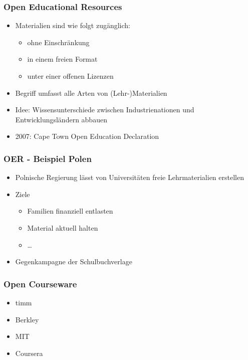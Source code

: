 \documentclass[table]{beamer}
\begin{document}
\begin{frame}
  \frametitle{Open Educational Resources}
    \begin{itemize}
        \item<2-> Materialien sind wie folgt zugänglich:
            \begin{itemize}
                \item<3-> ohne Einschränkung
                \item<4-> in einem freien Format
                \item<5-> unter einer offenen Lizenzen 
            \end{itemize}
        \item<6-> Begriff umfasst alle Arten von (Lehr-)Materialien
        \item<7-> Idee: Wissensunterschiede zwischen Industrienationen und Entwicklungsländern abbauen
        \item<8-> 2007: Cape Town Open Education Declaration
    \end{itemize}
\end{frame}

\begin{frame}
    \frametitle{OER - Beispiel Polen}
    \begin{itemize}
        \item<2-> Polnische Regierung lässt von Universitäten freie Lehrmaterialien erstellen
        \item<3-> Ziele
            \begin{itemize}
                \item<4-> Familien finanziell entlasten
                \item<5-> Material aktuell halten
                \item<6-> \ldots
            \end{itemize}
        \item<7-> Gegenkampagne der Schulbuchverlage
    \end{itemize}
\end{frame}

\begin{frame}
    \frametitle{Open Courseware}
      \begin{itemize}
        \item<2-> timm
        \item<3-> Berkley
        \item<4-> MIT
        \item<5-> Coursera
    \end{itemize}
\end{frame}
\end{document}

